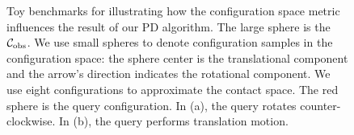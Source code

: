 \begin{figure}[!h]
\centering
{}
\caption[Toy benchmarks for illustrating how the configuration space metric influences the result of our PD algorithm]{Toy benchmarks for illustrating how the configuration space metric influences the result of our PD algorithm. The large sphere is the $\mathcal C_{\text{obs}}$. We use small spheres to denote configuration samples in the configuration space: the sphere center is the translational component and the arrow's direction indicates the rotational component. We use eight configurations to approximate the contact space. The red sphere is the query configuration. In (a), the query rotates counter-clockwise. In (b), the query performs translation motion.}\label{fig:2:toybenchmark}
\end{figure}



